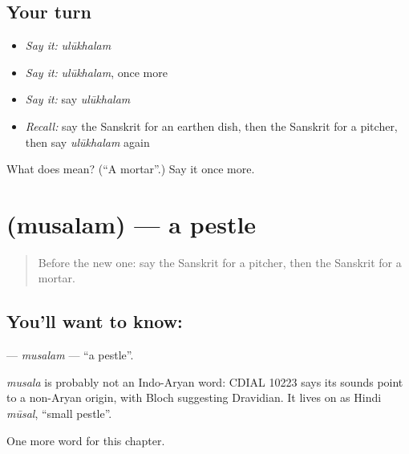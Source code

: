 \subsection*{Your turn}
\begin{itemize}
\raggedright
  \item \emph{Say it:} \emph{ulūkhalam}
  \item \emph{Say it:} \emph{ulūkhalam}, once more
  \item \emph{Say it:} say \emph{ulūkhalam}
  \item \emph{Recall:} say the Sanskrit for an earthen dish, then the Sanskrit for a pitcher, then say \emph{ulūkhalam} again
\end{itemize}

\begin{tcolorbox}[breakable,colback=teal!4,colframe=teal!35!black,title={Before you move on}]
What does  mean? (\textquotedblleft{}A mortar\textquotedblright{}.) Say it once more.
\end{tcolorbox}
\section[\texorpdfstring{\sk{मुसलम्} (musalam)}{मुसलम् (musalam)}]{ (musalam) — a pestle}

\label{lesson:SA-C191-musalam}



\begin{quote}
Before the new one: say the Sanskrit for a pitcher, then the Sanskrit for a mortar.
\end{quote}

\subsection*{You'll want to know: }
\textbf{} — \emph{musalam} — \textquotedblleft{}a pestle\textquotedblright{}.

\begin{cousinweb}
\emph{musala} is probably not an Indo-Aryan word: CDIAL 10223 says its sounds point to a non-Aryan origin, with Bloch suggesting Dravidian. It lives on as Hindi \emph{mūsal}, \textquotedblleft{}small pestle\textquotedblright{}.
\end{cousinweb}

\begin{grammarlens}[title={What you've built}]
One more word for this chapter.
\end{grammarlens}

